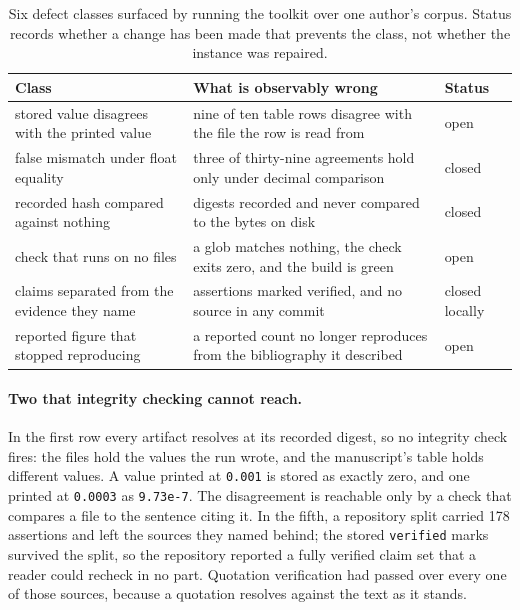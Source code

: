 \documentclass{article}
\newcommand{\code}[1]{\texttt{#1}}
\begin{document}
\begin{table}[h]
\centering
\small
\caption{Six defect classes surfaced by running the toolkit over one author's corpus. Status
records whether a change has been made that prevents the class, not whether the instance was
repaired.}
\label{tab:defects}
\begin{tabular}{@{}>{\raggedright\arraybackslash}p{}>{\raggedright\arraybackslash}p{}>{\raggedright\arraybackslash}p{}@{}}
\toprule
\textbf{Class} & \textbf{What is observably wrong} & \textbf{Status} \\
\midrule
stored value disagrees with the printed value & nine of ten table rows disagree with the file the row is read from & open \\
false mismatch under float equality & three of thirty-nine agreements hold only under decimal comparison & closed \\
recorded hash compared against nothing & digests recorded and never compared to the bytes on disk & closed \\
check that runs on no files & a glob matches nothing, the check exits zero, and the build is green & open \\
claims separated from the evidence they name & 178 assertions marked verified, and no source in any commit & closed locally \\
reported figure that stopped reproducing & a reported count no longer reproduces from the bibliography it described & open \\
\bottomrule
\end{tabular}
\end{table}

\paragraph{Two that integrity checking cannot reach.} In the first row every artifact resolves at
its recorded digest, so no integrity check fires: the files hold the values the run wrote, and the
manuscript's table holds different values. A value printed at \code{0.001} is stored as exactly
zero, and one printed at \code{0.0003} as \code{9.73e-7}. The disagreement is reachable only by a
check that compares a file to the sentence citing it. In the fifth, a repository split carried 178
assertions and left the sources they named behind; the stored \code{verified} marks survived the
split, so the repository reported a fully verified claim set that a reader could recheck in no
part. Quotation verification had passed over every one of those sources, because a quotation
resolves against the text as it stands.
\end{document}
